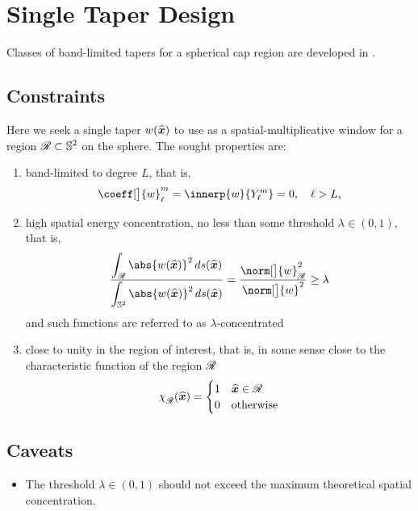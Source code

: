 \documentclass[10pt, twocolumn, twoside]{IEEEtran}
\newcommand{\untsph}{\mathbb{S}^{2}} %
\newcommand{\unit}[1]{\widehat{\bm{#1}}}
\begin{document}
\tableofcontents

\clearpage

\section{Single Taper Design}

\begin{bibunit}


Classes of band-limited tapers for a spherical cap region are developed in \cite{Wieczorek:2005}.

\subsection{Constraints}

Here we seek a single taper $\taper(\unit{x})$ to use as a spatial-multiplicative window for a region $\R\subset\untsph$ on the sphere.  The sought properties are:
\begin{enumerate}
\item band-limited to degree $L$, that is,
\[
\coeff[\big]{\taper}_{\ell}^{m} = \innerp{\taper}{Y_{\ell}^{m}} = 0,\quad \ell>L,
\]
\item high spatial energy concentration, no less than some threshold $\lambda\in(0,1)$, that is,
\[
\frac{\displaystyle\int_{\R} \abs{\taper(\unit{x})}^2\,ds(\unit{x})}
{\displaystyle\int_{\untsph} \abs{\taper(\unit{x})}^2\,ds(\unit{x})} =
\frac{\norm[\big]{\taper}_{\R}^2}
{\norm[\big]{\taper}^2}
\geq \lambda
\]
and such functions are referred to as $\lambda$-concentrated

\item close to unity in the region of interest, that is, in some sense close to the characteristic function of the region $\mathscr{R}$
\[
\chfn(\unit{x}) =
\begin{cases}
1 & \unit{x}\in\R \\
0 & \text{otherwise}%
\end{cases}
\]
\end{enumerate}

\subsection{Caveats}

\begin{itemize}
\item
The threshold $\lambda\in(0,1)$ should not exceed the maximum theoretical spatial concentration. 


\end{itemize}
\end{bibunit}
\end{document}

